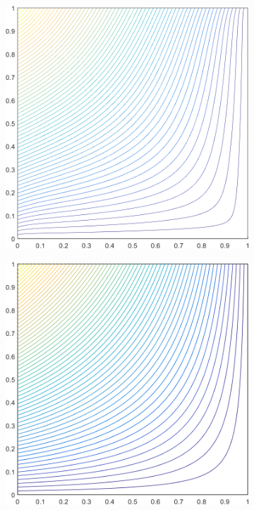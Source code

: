 \documentclass[11pt]{article}
\begin{document}
\begin{figure}
\begin{subfigure}[b]{0.30\textwidth}
		\caption{}
	\end{subfigure}
	\vfill
	\begin{subfigure}[b]{0.30\textwidth}
		\centering
		\includegraphics[width=\textwidth]{figures/square_MV1_contour_b4.png}
		\caption{}
	\end{subfigure}
	\hspace{1cm}
	\begin{subfigure}[b]{0.30\textwidth}
		\centering
		\includegraphics[width=\textwidth]{figures/square_MAXENT1_contour_b4.png}

\end{subfigure}
\end{figure}
\end{document}
